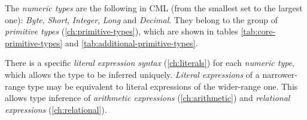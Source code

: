 The \emph{numeric types} are the following in CML
(from the smallest set to the largest one):
\emph{Byte}, \emph{Short}, \emph{Integer}, \emph{Long} and \emph{Decimal}.
They belong to the group of \emph{primitive types} (\ref{ch:primitive-types}),
which are shown in tables \ref{tab:core-primitive-types} and \ref{tab:additional-primitive-types}.

There is a specific \emph{literal expression syntax} (\ref{ch:literals})
for each \emph{numeric type},
which allows the type to be inferred uniquely.
\emph{Literal expressions} of a narrower-range type may be equivalent
to literal expressions of the wider-range one.
This allows type inference of \emph{arithmetic expressions} (\ref{ch:arithmetic})
and \emph{relational expressions} (\ref{ch:relational}).
